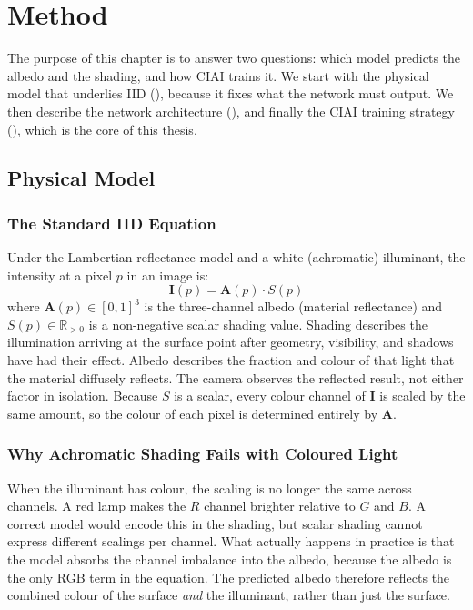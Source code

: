 \chapter{Method}
\label{ch:method}

The purpose of this chapter is to answer two questions: which model predicts the albedo
and the shading, and how CIAI trains it. We start with the physical model that underlies IID
(), because it fixes what the network must output. We then describe the
network architecture (), and finally the CIAI training strategy
(), which is the core of this thesis.


\section{Physical Model}
\label{sec:physics}

\subsection{The Standard IID Equation}

Under the Lambertian reflectance model and a white (achromatic) illuminant,
the intensity at a pixel $p$ in an image is:
\begin{equation}
  \mathbf{I}(p) = \mathbf{A}(p) \cdot S(p)
  \label{eq:iid}
\end{equation}
where $\mathbf{A}(p) \in [0,1]^3$ is the three-channel albedo (material
reflectance) and $S(p) \in \mathbb{R}_{>0}$ is a non-negative scalar shading
value. Shading describes the illumination arriving at the surface point after
geometry, visibility, and shadows have had their effect. Albedo describes the
fraction and colour of that light that the material diffusely reflects. The
camera observes the reflected result, not either factor in isolation. Because $S$ is a
scalar, every colour channel of $\mathbf{I}$ is scaled by the same amount, so the colour of
each pixel is determined entirely by $\mathbf{A}$.

\subsection{Why Achromatic Shading Fails with Coloured Light}

When the illuminant has colour, the scaling is no longer the same across channels.
A red lamp makes the $R$ channel brighter relative to $G$ and $B$.
A correct model would encode this in the shading, but scalar shading cannot express
different scalings per channel.
What actually happens in practice is that the model absorbs the channel imbalance
into the albedo, because the albedo is the only RGB term in the equation.
The predicted albedo therefore reflects the combined colour of the surface
\emph{and} the illuminant, rather than just the surface.


